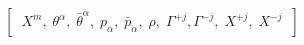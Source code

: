 \begin{equation}
\left[\;\; X^m,\;\theta^{\alpha},\;\bar\theta^{\dot\alpha},\;
p_{\alpha},\; \bar{p}_{\dot\alpha}, \;\rho,\;\Gamma^{+j},
\Gamma^{-j},\; X^{+j},\; X^{-j}\;\; \right] \label{3} \nonumber
\end{equation}

